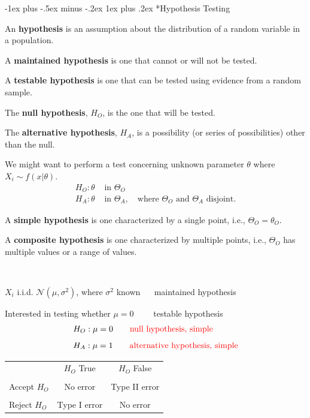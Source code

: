 \documentclass[a4paper,10pt,landscape]{article}
\makeatletter
\renewcommand{\subsubsection}{\@startsection{subsubsection}{3}{0mm}%
                                {-1ex plus -.5ex minus -.2ex}%
                                {1ex plus .2ex}%
                                {\normalfont\small\bfseries}}
\makeatother
\begin{document}
\begin{multicols*}{3}
\subsubsection*{Hypothesis Testing}

\begin{description}
	\item An {\bf hypothesis} is an assumption about the distribution of a random variable in a population.
	\item A {\bf maintained hypothesis} is one that cannot or will not be tested.
	\item A {\bf testable hypothesis} is one that can be tested using evidence from a random sample.
	\item The {\bf null hypothesis}, $H_O$, is the one that will be tested.
	\item The {\bf alternative hypothesis}, $H_A$, is a possibility (or series of possibilities) other than the null.
	\item We might want to perform a test concerning unknown parameter $\theta$ where $X_i\sim f(x|\theta)$.
	\begin{align*}
		H_O: \theta & \text{ in }\Theta_O\\
		H_A: \theta & \text{ in }\Theta_A,\quad\text{where }\Theta_O\text{ and }\Theta_A\text{ disjoint}.
	\end{align*}
	\item A {\bf simple hypothesis} is one characterized by a single point, i.e., $\Theta_O=\theta_O$.
	\item A {\bf composite hypothesis} is one characterized by multiple points, i.e., $\Theta_O$ has multiple values or a range of values.
	\item[Example] ~
	
	$X_i$ i.i.d. $\mathcal{N}(\mu,\sigma^2)$, where $\sigma^2$ known $\quad$ {\color{red} maintained hypothesis}
	
	Interested in testing whether $\mu=0$ $\qquad${\color{red}testable hypothesis}
	$$H_O: \mu=0\qquad{\color{red}\text{null hypothesis, simple}}\qquad\quad$$
	$$H_A: \mu=1\qquad{\color{red}\text{alternative hypothesis, simple}}$$
\end{description}
\medskip

\begin{minipage}[h]{\columnwidth}
	\centering
		\begin{tabular}{lcc}
			& $H_O$ True  & $H_O$ False   \\[1pt]
			& \cellcolor[HTML]{DAE8FC} & \cellcolor[HTML]{C0C0C0}\\[-0.5em]
			Accept $H_O$ & \cellcolor[HTML]{DAE8FC}No error & \cellcolor[HTML]{C0C0C0}Type II error \\[2pt]
			& \cellcolor[HTML]{C0C0C0} & \cellcolor[HTML]{DAE8FC}\\[-0.5em]
			Reject $H_O$ & \cellcolor[HTML]{C0C0C0}Type I error & \cellcolor[HTML]{DAE8FC}No error\\ [2pt]
		\end{tabular}
\end{minipage}
\medskip


\end{multicols*}
\end{document}
